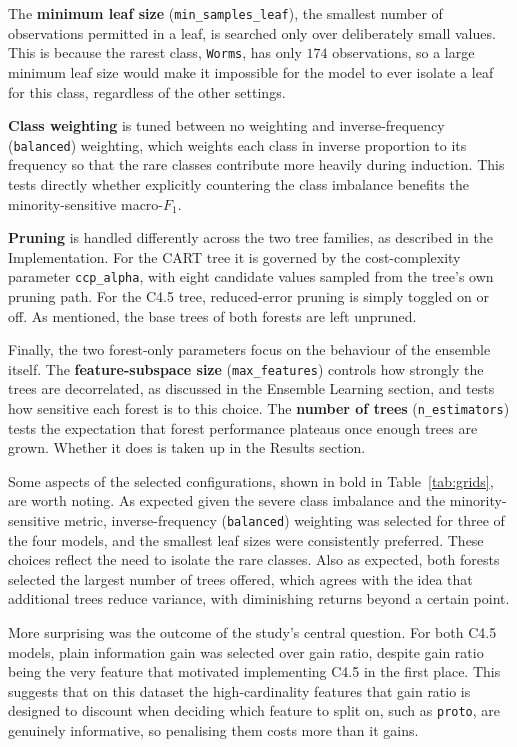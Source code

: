 \documentclass[conference]{IEEEtran}
\begin{document}
The \textbf{minimum leaf size} (\texttt{min\_samples\_leaf}), the smallest number of observations
permitted in a leaf, is searched only over deliberately small values. This is because the rarest class, 
\texttt{Worms}, has only $174$
observations, so a large minimum leaf size would make it impossible for the model to ever isolate a
leaf for this class, regardless of the other settings.

\textbf{Class weighting} is tuned between no weighting and inverse-frequency (\texttt{balanced})
weighting, which weights each class in inverse proportion to its frequency so that the rare
classes contribute more heavily during induction. This tests directly whether explicitly
countering the class imbalance benefits the minority-sensitive macro-$F_1$.

\textbf{Pruning} is handled differently across the two tree families, as described in the
Implementation. For the CART tree it is governed by the cost-complexity parameter
\texttt{ccp\_alpha}, with eight candidate values sampled from the tree's own pruning path. For the
C4.5 tree, reduced-error pruning is simply toggled on or off. As mentioned, the base trees of both forests are
left unpruned.

Finally, the two forest-only parameters focus on the behaviour of the ensemble itself. The
\textbf{feature-subspace size} (\texttt{max\_features}) controls how strongly the trees are
decorrelated, as discussed in the Ensemble Learning section, and tests how sensitive each forest
is to this choice. The \textbf{number of trees} (\texttt{n\_estimators}) tests the expectation that forest
performance plateaus once enough trees are grown. Whether it does is taken up in the Results section.

Some aspects of the selected configurations, shown in bold in Table~\ref{tab:grids}, are worth
noting. As expected given the severe class imbalance and the minority-sensitive metric,
inverse-frequency (\texttt{balanced}) weighting was selected for three of the four models, and the
smallest leaf sizes were consistently preferred. These choices reflect the need to isolate the rare classes.
Also as expected, both forests selected the largest number of trees
offered, which agrees with the idea that additional trees reduce variance, with diminishing returns
beyond a certain point.

More surprising was the outcome of the study's central question. For both C4.5 models, plain
information gain was selected over gain ratio, despite gain ratio being the very feature that
motivated implementing C4.5 in the first place. This suggests that on this dataset the
high-cardinality features that gain ratio is designed to discount when deciding which
feature to split on, such as \texttt{proto}, are
genuinely informative, so penalising them costs more than it gains.
\end{document}
